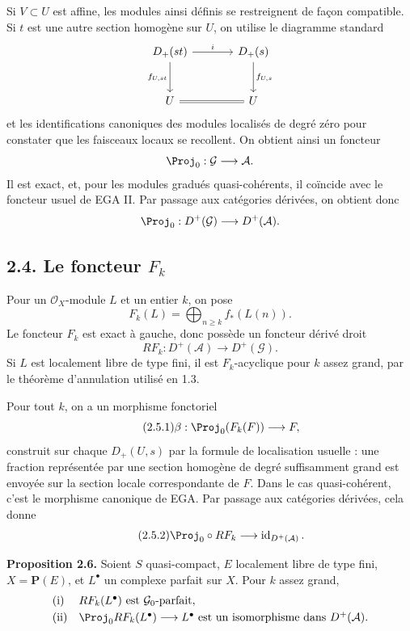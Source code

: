 \documentclass[11pt]{article}
\begin{document}
Si \(V\subset U\) est affine, les modules ainsi définis se restreignent de façon compatible. Si \(t\) est une autre section homogène sur \(U\), on utilise le diagramme standard
\[
\begin{tikzcd}[column sep=large,row sep=large]
D_+(st) \arrow[r,"i"] \arrow[d,"f_{U,st}"'] &
D_+(s) \arrow[d,"f_{U,s}"]\\
U \arrow[r,equal] & U
\end{tikzcd}
\]
et les identifications canoniques des modules localisés de degré zéro pour constater que les faisceaux locaux se recollent. On obtient ainsi un foncteur
\[
  \Proj_0:\mathcal G\longrightarrow\mathcal A .
\]
Il est exact, et, pour les modules gradués quasi-cohérents, il coïncide avec le foncteur usuel de EGA II. Par passage aux catégories dérivées, on obtient donc
\[
  \Proj_0:D^+(\mathcal G)\longrightarrow D^+(\mathcal A).
\]

\subsection*{2.4. Le foncteur \(F_k\)}
Pour un \(\mathcal O_X\)-module \(L\) et un entier \(k\), on pose
\begin{equation}\tag{2.4.1}
  F_k(L)=\bigoplus_{n\geq k} f_*(L(n)).
\end{equation}
Le foncteur \(F_k\) est exact à gauche, donc possède un foncteur dérivé droit
\begin{equation}\tag{2.4.2}
  RF_k:D^+(\mathcal A)\longrightarrow D^+(\mathcal G).
\end{equation}
Si \(L\) est localement libre de type fini, il est \(F_k\)-acyclique pour \(k\) assez grand, par le théorème d'annulation utilisé en 1.3.

Pour tout \(k\), on a un morphisme fonctoriel
\begin{equation}\tag{2.5.1}
  \beta:\Proj_0(F_k(F))\longrightarrow F,
\end{equation}
construit sur chaque \(D_+(U,s)\) par la formule de localisation usuelle : une fraction représentée par une section homogène de degré suffisamment grand est envoyée sur la section locale correspondante de \(F\). Dans le cas quasi-cohérent, c'est le morphisme canonique de EGA. Par passage aux catégories dérivées, cela donne
\begin{equation}\tag{2.5.2}
  \Proj_0\circ RF_k\longrightarrow \operatorname{id}_{D^+(\mathcal A)}.
\end{equation}

\textbf{Proposition 2.6.} Soient \(S\) quasi-compact, \(E\) localement libre de type fini, \(X=\mathbf P(E)\), et \(L^\bullet\) un complexe parfait sur \(X\). Pour \(k\) assez grand,
\[
\begin{array}{ll}
\text{\rm (i)}& RF_k(L^\bullet)\text{ est }\mathcal G_0\text{-parfait},\\[1mm]
\text{\rm (ii)}& \Proj_0 RF_k(L^\bullet)\longrightarrow L^\bullet
\text{ est un isomorphisme dans }D^+(\mathcal A).
\end{array}
\]
\end{document}
